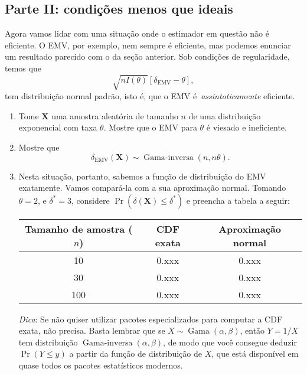 \documentclass[a4paper,10pt, notitlepage]{report}
\begin{document}
\subsection*{Parte II: condições menos que ideais}

Agora vamos lidar com uma situação onde o estimador em questão não é eficiente.
O EMV, por exemplo, nem sempre é eficiente, mas podemos enunciar um resultado parecido com o da seção anterior. 
Sob condições de regularidade, temos que
 $$
 \sqrt{nI(\theta)}\left[\delta_{\text{EMV}}-\theta\right],
 $$
tem distribuição normal padrão,  isto é, que o EMV é~\textit{assintoticamente} eficiente.

\begin{enumerate}\addtocounter{enumi}{4}
 \item Tome $\boldsymbol{X}$ uma amostra aleatória de tamanho $n$ de uma distribuição exponencial com taxa $\theta$.
 Mostre que o EMV para $\theta$ é viesado e ineficiente.
 \item Mostre que
 $$
 \delta_{\text{EMV}}(\boldsymbol{X}) \sim \operatorname{Gama-inversa}(n, n\theta).
 $$
 \item Nesta situação, portanto, sabemos a função de distribuição do EMV exatamente.
 Vamos compará-la com a sua aproximação normal.
 Tomando $\theta = 2$, e $\delta^\ast = 3$, considere $\operatorname{Pr}(\delta(\boldsymbol{X}) \leq \delta^\ast)$ e preencha a tabela a seguir:
 \begin{table}[!ht]
\begin{center}
 \begin{tabular}{ccc}
\hline
Tamanho de amostra ($n$) & CDF exata & Aproximação normal \\ \hline
10 & 0.xxx & 0.xxx \\
30 & 0.xxx & 0.xxx \\
100 & 0.xxx & 0.xxx
\end{tabular}
\end{center}
\end{table}

 \textit{Dica}: Se não quiser utilizar pacotes especializados para computar a CDF exata, não precisa. 
 Basta lembrar que se $X \sim \operatorname{Gama}(\alpha, \beta)$, então $Y = 1/X$ tem distribuição $\operatorname{Gama-inversa}(\alpha, \beta)$, de modo que você consegue deduzir $\operatorname{Pr}(Y \leq y)$ a partir da função de distribuição de $X$, que está disponível em quase todos os pacotes estatísticos modernos. 
\end{enumerate}



\end{document}
